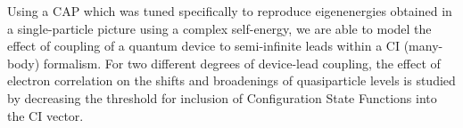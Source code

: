 Using a \acl{CAP} which was tuned specifically to reproduce eigenenergies
obtained in a single-particle picture using a complex self-energy, we are able
to model the effect of coupling of a quantum device to semi-infinite leads
within a \ac{CI} (many-body) formalism. For two different degrees of
device-lead coupling, the effect of electron correlation on the shifts and
broadenings of quasiparticle levels is studied by decreasing the threshold for
inclusion of Configuration State Functions into the \ac{CI} vector.
